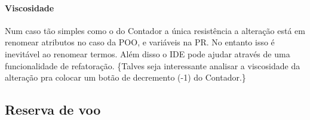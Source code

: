 \paragraph{Viscosidade}
\label{sec:orga25b6c9}
Num caso tão simples como o do Contador a única resistência a alteração
está em renomear atributos no caso da POO, e variáveis na PR.
No entanto isso é inevitável ao renomear termos.
Além disso o IDE pode ajudar através de uma funcionalidade de refatoração.
\todo\{Talves seja interessante analisar a viscosidade da alteração pra
colocar um botão de decremento (-1) do Contador.\}

\subsection{Reserva de voo}
\label{sec:org4afc389}
